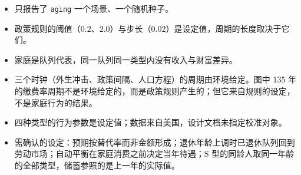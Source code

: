 \documentclass[UTF8,11pt,a4paper]{ctexart}
\begin{document}
\begin{itemize}
  \item 只报告了 \texttt{aging} 一个场景、一个随机种子。
  \item 政策规则的阈值（$0.2$、$2.0$）与步长（$0.02$）是设定值，周期的长度取决于它们。
  \item 家庭是队列代表，同一队列同一类型内没有收入与财富差异。
  \item 三个时钟（外生冲击、政策间隔、人口方程）的周期由环境给定。图中 135 年的缴费率周期不是环境给定的，而是政策规则产生的；但它来自规则的设定，不是家庭行为的结果。
  \item 四种类型的行为参数是设定值；数据来自美国，设计文档未指定校准对象。
  \item 需确认的设定：预期按替代率而非金额形成；退休年龄上调时已退休队列回到劳动市场；自动平衡在家庭消费之前决定当年待遇；S 型的同龄人取同一年龄的全部类型，储蓄参照的是上一年的实际值。
\end{itemize}
\end{document}
